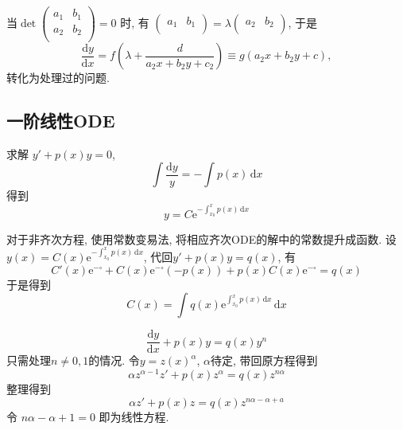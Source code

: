 \begin{example}
  当$\det \begin{pmatrix}
  a_1 & b_1\\
  a_2 & b_2\\
  \end{pmatrix} = 0$ 时, 有 $\begin{pmatrix}
  a_1 & b_1\\
  \end{pmatrix} = \lambda \begin{pmatrix}
  a_2 & b_2\\
  \end{pmatrix}$, 于是
  \begin{equation}
    \frac{\mathrm{d} y}{\mathrm{d} x} = f \left( \lambda + \frac{d}{a_2x + b_2y + c_2} \right) \equiv g\left( a_2x + b_2y + c \right),
  \end{equation}
  转化为处理过的问题.
\end{example}

\subsection{一阶线性ODE}

\begin{example}
  求解 $y' + p(x) y = 0$,
  \begin{equation}
    \int \frac{\mathrm{d} y}{y} = - \int p(x) \, \mathrm{d} x
  \end{equation}
  得到
  \begin{equation}
    y = C \mathrm{e}^{- \int_{x_0}^{x} p(x) \, \mathrm{d}x }
  \end{equation}
\end{example}

对于非齐次方程, 使用常数变易法, 将相应齐次ODE的解中的常数提升成函数. 设$y(x) = C(x) \mathrm{e}^{- \int_{x_0}^{x} p(x) \, \mathrm{d}x }$, 代回$y' + p(x)y = q(x)$, 有
\begin{equation}
  C'(x) \mathrm{e}^{- \square} + C(x) \mathrm{e}^{- \square} \left( -p(x) \right) + p(x) C(x) \mathrm{e}^{-\square} = q(x)
\end{equation}
于是得到
\begin{equation}
  C(x) = \int q(x) \mathrm{e}^{\int_{x_0}^{x} p(x) \, \mathrm{d}x }\, \mathrm{d} x
\end{equation}

\begin{example}[伯努利方程]
  \begin{equation}
    \frac{\mathrm{d} y}{\mathrm{d} x} + p(x)y = q(x)y^{n}
  \end{equation}
  只需处理$n \neq 0, 1$的情况. 令$y = z(x)^{\alpha}$, $\alpha$待定, 带回原方程得到
  \begin{equation}
    \alpha z^{\alpha - 1} z' + p(x) z^{\alpha} = q(x) z^{n\alpha}
  \end{equation}
  整理得到
  \begin{equation}
    \alpha  z' + p(x) z = q(x) z^{n\alpha - \alpha + a}
  \end{equation}
  令 $n\alpha - \alpha + 1 = 0$ 即为线性方程.
\end{example}


